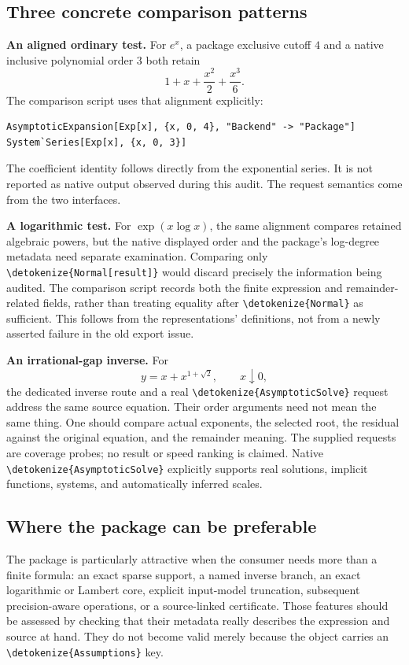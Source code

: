 \documentclass[11pt,a4paper]{article}
\newcommand{\wl}[1]{\texttt{\expandafter\nolinkurl\expandafter{\detokenize{#1}}}}
\begin{document}
\subsection{Three concrete comparison patterns}

\textbf{An aligned ordinary test.} For $e^x$, a package exclusive cutoff $4$
and a native inclusive polynomial order $3$ both retain
\[
 1+x+\frac{x^2}{2}+\frac{x^3}{6}.
\]
The comparison script uses that alignment explicitly:
\begin{lstlisting}
AsymptoticExpansion[Exp[x], {x, 0, 4}, "Backend" -> "Package"]
System`Series[Exp[x], {x, 0, 3}]
\end{lstlisting}
The coefficient identity follows directly from the exponential series. It is
not reported as native output observed during this audit. The request semantics
come from the two interfaces.\cite{core,wlseries}

\textbf{A logarithmic test.} For $\exp(x\log x)$, the same alignment compares
retained algebraic powers, but the native displayed order and the package's
log-degree metadata need separate examination. Comparing only
\wl{Normal[result]} would discard precisely the information being audited.
The comparison script records both the finite expression and remainder-related
fields, rather than treating equality after \wl{Normal} as sufficient.
This follows from the representations' definitions, not from a newly asserted
failure in the old export issue.\cite{core,wlseriesdata}

\textbf{An irrational-gap inverse.} For
\[
 y=x+x^{1+\sqrt2},\qquad x\downarrow0,
\]
the dedicated inverse route and a real \wl{AsymptoticSolve} request address the
same source equation. Their order arguments need not mean the same thing.
One should compare actual exponents, the selected root, the residual against the
original equation, and the remainder meaning. The supplied requests are
coverage probes; no result or speed ranking is claimed. Native
\wl{AsymptoticSolve} explicitly supports real solutions, implicit functions,
systems, and automatically inferred scales.\cite{core,wlasymsolve}

\subsection{Where the package can be preferable}

The package is particularly attractive when the consumer needs more than a
finite formula: an exact sparse support, a named inverse branch, an exact
logarithmic or Lambert core, explicit input-model truncation, subsequent
precision-aware operations, or a source-linked certificate. Those features
should be assessed by checking that their metadata really describes the
expression and source at hand. They do not become valid merely because the
object carries an \wl{Assumptions} key.\cite{core,special,cert}
\end{document}
